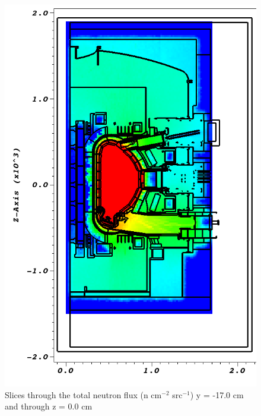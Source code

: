 \documentclass[12pt]{article}
\begin{document}
\begin{figure}[ht!]
  \includegraphics[scale=0.35]{../plots/neutron/b4c/flux_y-17.png}
  \caption{Slices through the total neutron flux (n cm$^{-2}$ src$^{-1}$)
           y = -17.0 cm and through z = 0.0 cm}
  \label{fig:wwinp}
\end{figure}
\end{document}
